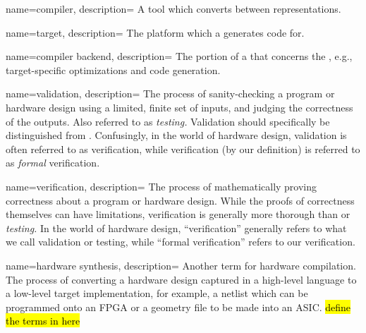 
\DeclareRobustCommand{\glossfirstformat}[1]{\textit{#1}}
\renewcommand*{\glsdisplayfirst}[4]{\glossfirstformat{#1#4}}
\usepackage[normalem]{ulem}
\renewcommand*{\glstextformat}[1]{\color{lightgray}{\dotuline{\color{black} #1}}}


\makenoidxglossaries


{
    name=compiler,
    description={
A tool which converts between representations.
    }
}


{
    name=target,
    description={
The platform which a  generates code for.
    }
}

{
    name=compiler backend,
    description={
The portion of a  that concerns the ,
  e.g., target-specific optimizations and code generation.
    }
}

{
    name=validation,
    description={
The process of sanity-checking a program or hardware design using a
  limited, finite set
  of inputs, and judging the correctness 
  of the outputs.
Also referred to as \textit{testing.}
Validation should specifically be distinguished from
  .
Confusingly, 
  in the world of hardware design,
  validation is often referred to as
  verification,
  while verification (by our definition)
  is referred to as \textit{formal} verification.
    }
}

{
    name=verification,
    description={
The process of mathematically proving correctness
  about a program or hardware design.
While the proofs of correctness themselves
  can have limitations,
  verification is generally more thorough
  than  or \textit{testing.}
In the world of hardware design,
  ``verification''
  generally refers to what we call validation or testing,
  while ``formal verification''
  refers to our verification.
    }
}

{
    name={hardware synthesis},
    description={
Another term for hardware compilation.
The process of converting a hardware design
  captured in a high-level language
  to a low-level target implementation,
  for example,
  a netlist which can be programmed onto an FPGA
  or a geometry file to be made into an ASIC.
  \hl{define the terms in here}
    }
}